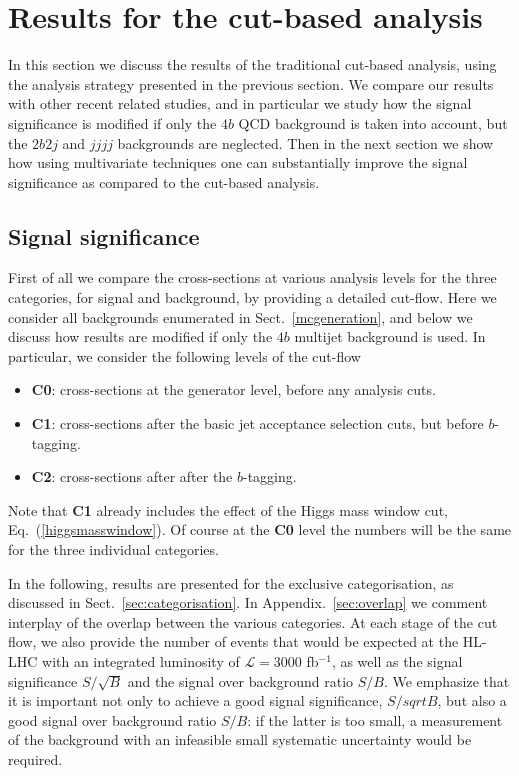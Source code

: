 
\section{Results for the cut-based analysis}

\label{sec:results}

In this section we discuss the results of the traditional
cut-based analysis, using the analysis strategy presented in the previous
section.
%
We compare our results with other recent related studies,
and in particular we study how the signal significance
is modified if only the $4b$ QCD background is taken into account,
but the $2b2j$ and $jjjj$ backgrounds are neglected.
%
Then in the next section we show how using multivariate techniques
one can substantially improve the signal significance as compared
to the cut-based analysis.



\subsection{Signal significance}

First of all we compare the cross-sections at various
analysis levels for the three categories, for signal and background,
by providing a detailed cut-flow.
%
Here we consider all backgrounds enumerated in Sect.~\ref{mcgeneration},
and below we discuss how results are modified if only the $4b$
multijet background is used.
%
In particular,
we consider the following levels of the cut-flow
\begin{itemize}
\item {\bf C0}: cross-sections at the generator
  level, before any analysis cuts.
\item {\bf C1}:  cross-sections after the basic jet acceptance selection
  cuts, but before $b$-tagging.
\item {\bf C2}: cross-sections after after the $b$-tagging.
\end{itemize}
Note that {\bf C1} already includes the effect of the Higgs mass
window cut, Eq.~(\ref{higgsmasswindow}).
%
Of course at the {\bf C0} level the numbers will be the same
for the three individual categories.

In the following, results are presented for the exclusive
categorisation, as discussed in Sect.~\ref{sec:categorisation}.
%
In Appendix.~\ref{sec:overlap} we comment
interplay of the overlap between the various categories.
%
At each stage of the cut flow, we also provide the number
of events that would be expected at the HL-LHC with
an integrated luminosity of $\mathcal{L}=3000$ fb$^{-1}$,
as well as 
the signal significance $S/\sqrt{B}$ and the signal
over background ratio $S/B$.
%
We emphasize that it is important not only to achieve a good signal
significance, $S/sqrt{B}$, but also a good signal over background ratio $S/B$:
if the latter is too small, a measurement of the background with an infeasible small
systematic uncertainty would be required.


